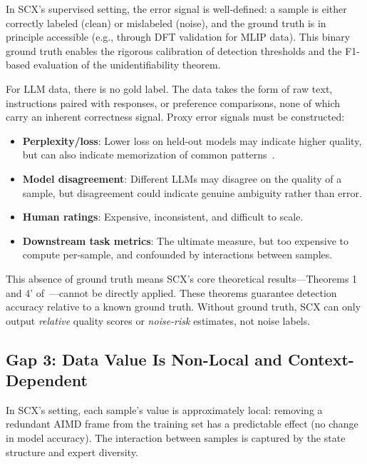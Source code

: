 \documentclass[11pt,twocolumn]{article}
\begin{document}
In SCX's supervised setting, the error signal is well-defined: a sample is either correctly labeled (clean) or mislabeled (noise), and the ground truth is in principle accessible (e.g., through DFT validation for MLIP data). This binary ground truth enables the rigorous calibration of detection thresholds and the F1-based evaluation of the unidentifiability theorem.

For LLM data, there is no gold label. The data takes the form of raw text, instructions paired with responses, or preference comparisons, none of which carry an inherent correctness signal. Proxy error signals must be constructed:
\begin{itemize}
    \item \textbf{Perplexity/loss}: Lower loss on held-out models may indicate higher quality, but can also indicate memorization of common patterns~\cite{carlini2023quantifying}.
    \item \textbf{Model disagreement}: Different LLMs may disagree on the quality of a sample, but disagreement could indicate genuine ambiguity rather than error.
    \item \textbf{Human ratings}: Expensive, inconsistent, and difficult to scale.
    \item \textbf{Downstream task metrics}: The ultimate measure, but too expensive to compute per-sample, and confounded by interactions between samples.
\end{itemize}

This absence of ground truth means SCX's core theoretical results---Theorems 1 and 4' of~\cite{scx2026}---cannot be directly applied. These theorems guarantee detection accuracy relative to a known ground truth. Without ground truth, SCX can only output \textit{relative} quality scores or \textit{noise-risk} estimates, not noise labels.

\subsection{Gap 3: Data Value Is Non-Local and Context-Dependent}

In SCX's setting, each sample's value is approximately local: removing a redundant AIMD frame from the training set has a predictable effect (no change in model accuracy). The interaction between samples is captured by the state structure and expert diversity.
\end{document}
